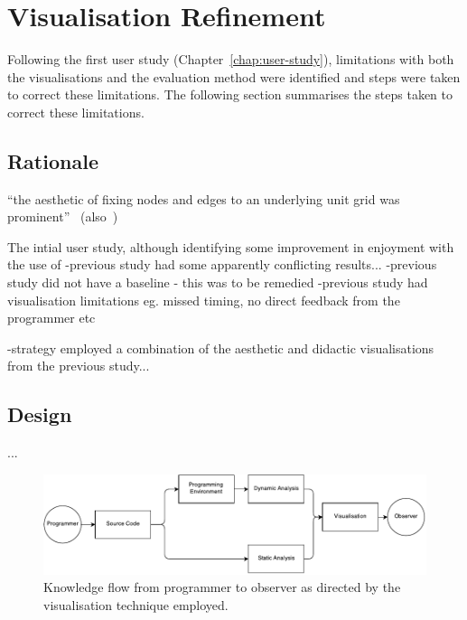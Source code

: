 
\chapter{Visualisation Refinement}
\label{chap:visualisation-refinement}


Following the first user study (Chapter~\ref{chap:user-study}), limitations with both the visualisations and the evaluation method were identified and steps were taken to correct these limitations. The following section summarises the steps taken to correct these limitations.

\section{Rationale}


``the aesthetic of fixing nodes and edges to an underlying unit grid was prominent''~\cite{Purchase2014} (also~\cite{Purchase2001,Purchase1996})

The intial user study, although identifying some improvement in enjoyment with the use of 
-previous study had some apparently conflicting results...
-previous study did not have a baseline - this was to be remedied
-previous study had visualisation limitations eg. missed timing, no direct feedback from the programmer etc


-strategy employed a combination of the aesthetic and didactic visualisations from the previous study...

\more

\section{Design}

\cite{Purchase1996}...

\begin{figure}
  \centering \includegraphics[width=\columnwidth]{../images/diagrams/knowledge-flow-refined.pdf}
  \caption{Knowledge flow from programmer to observer as directed by the visualisation technique employed.}
\label{fig:knowledge-flow-refined}
\end{figure}

